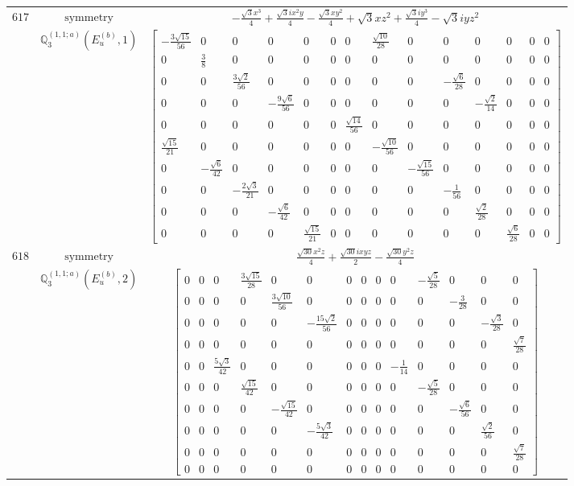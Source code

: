 \documentclass[fleqn,8pt,landscape]{jsarticle}
\begin{document}
\begin{longtable}{ccc}
$ 617 $ & $ \text{symmetry} $ & $ - \frac{\sqrt{3} x^{3}}{4} + \frac{\sqrt{3} i x^{2} y}{4} - \frac{\sqrt{3} x y^{2}}{4} + \sqrt{3} x z^{2} + \frac{\sqrt{3} i y^{3}}{4} - \sqrt{3} i y z^{2} $ \\
$  $ & $ \mathbb{Q}_{3}^{(1,1;a)}(E_{u}^{(b)},1) $ & $ \begin{bmatrix} - \frac{3 \sqrt{15}}{56} & 0 & 0 & 0 & 0 & 0 & 0 & \frac{\sqrt{10}}{28} & 0 & 0 & 0 & 0 & 0 & 0 \\ 0 & \frac{3}{8} & 0 & 0 & 0 & 0 & 0 & 0 & 0 & 0 & 0 & 0 & 0 & 0 \\ 0 & 0 & \frac{3 \sqrt{2}}{56} & 0 & 0 & 0 & 0 & 0 & 0 & - \frac{\sqrt{6}}{28} & 0 & 0 & 0 & 0 \\ 0 & 0 & 0 & - \frac{9 \sqrt{6}}{56} & 0 & 0 & 0 & 0 & 0 & 0 & - \frac{\sqrt{2}}{14} & 0 & 0 & 0 \\ 0 & 0 & 0 & 0 & 0 & 0 & \frac{\sqrt{14}}{56} & 0 & 0 & 0 & 0 & 0 & 0 & 0 \\ \frac{\sqrt{15}}{21} & 0 & 0 & 0 & 0 & 0 & 0 & - \frac{\sqrt{10}}{56} & 0 & 0 & 0 & 0 & 0 & 0 \\ 0 & - \frac{\sqrt{6}}{42} & 0 & 0 & 0 & 0 & 0 & 0 & - \frac{\sqrt{15}}{56} & 0 & 0 & 0 & 0 & 0 \\ 0 & 0 & - \frac{2 \sqrt{3}}{21} & 0 & 0 & 0 & 0 & 0 & 0 & - \frac{1}{56} & 0 & 0 & 0 & 0 \\ 0 & 0 & 0 & - \frac{\sqrt{6}}{42} & 0 & 0 & 0 & 0 & 0 & 0 & \frac{\sqrt{2}}{28} & 0 & 0 & 0 \\ 0 & 0 & 0 & 0 & \frac{\sqrt{15}}{21} & 0 & 0 & 0 & 0 & 0 & 0 & \frac{\sqrt{6}}{28} & 0 & 0 \end{bmatrix} $ \\ \hline
$ 618 $ & $ \text{symmetry} $ & $ \frac{\sqrt{30} x^{2} z}{4} + \frac{\sqrt{30} i x y z}{2} - \frac{\sqrt{30} y^{2} z}{4} $ \\
$  $ & $ \mathbb{Q}_{3}^{(1,1;a)}(E_{u}^{(b)},2) $ & $ \begin{bmatrix} 0 & 0 & 0 & \frac{3 \sqrt{15}}{28} & 0 & 0 & 0 & 0 & 0 & 0 & - \frac{\sqrt{5}}{28} & 0 & 0 & 0 \\ 0 & 0 & 0 & 0 & \frac{3 \sqrt{10}}{56} & 0 & 0 & 0 & 0 & 0 & 0 & - \frac{3}{28} & 0 & 0 \\ 0 & 0 & 0 & 0 & 0 & - \frac{15 \sqrt{2}}{56} & 0 & 0 & 0 & 0 & 0 & 0 & - \frac{\sqrt{3}}{28} & 0 \\ 0 & 0 & 0 & 0 & 0 & 0 & 0 & 0 & 0 & 0 & 0 & 0 & 0 & \frac{\sqrt{7}}{28} \\ 0 & 0 & \frac{5 \sqrt{3}}{42} & 0 & 0 & 0 & 0 & 0 & 0 & - \frac{1}{14} & 0 & 0 & 0 & 0 \\ 0 & 0 & 0 & \frac{\sqrt{15}}{42} & 0 & 0 & 0 & 0 & 0 & 0 & - \frac{\sqrt{5}}{28} & 0 & 0 & 0 \\ 0 & 0 & 0 & 0 & - \frac{\sqrt{15}}{42} & 0 & 0 & 0 & 0 & 0 & 0 & - \frac{\sqrt{6}}{56} & 0 & 0 \\ 0 & 0 & 0 & 0 & 0 & - \frac{5 \sqrt{3}}{42} & 0 & 0 & 0 & 0 & 0 & 0 & \frac{\sqrt{2}}{56} & 0 \\ 0 & 0 & 0 & 0 & 0 & 0 & 0 & 0 & 0 & 0 & 0 & 0 & 0 & \frac{\sqrt{7}}{28} \\ 0 & 0 & 0 & 0 & 0 & 0 & 0 & 0 & 0 & 0 & 0 & 0 & 0 & 0 \end{bmatrix} $ \\ \hline

\end{longtable}
\end{document}
